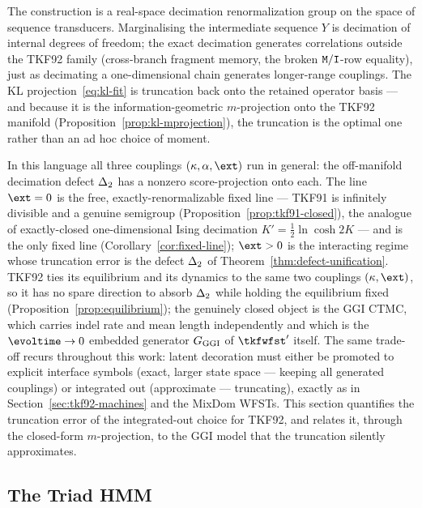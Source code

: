 The construction is a real-space decimation renormalization group on the
space of sequence transducers.  Marginalising the intermediate sequence
$Y$ is decimation of internal degrees of freedom; the exact decimation
generates correlations outside the TKF92 family (cross-branch fragment
memory, the broken $\mathtt{M}/\mathtt{I}$-row equality), just as decimating a
one-dimensional chain generates longer-range couplings.  The KL
projection~\eqref{eq:kl-fit} is truncation back onto the retained operator
basis --- and because it is the information-geometric $m$-projection onto
the TKF92 manifold (Proposition~\ref{prop:kl-mprojection}), the truncation
is the optimal one rather than an ad hoc choice of moment.

In this language all three couplings $(\kappa,\alpha,\ext)$ run in general:
the off-manifold decimation defect $\Delta_2$ has a nonzero
score-projection onto each.  The line $\ext=0$ is the free,
exactly-renormalizable fixed line --- TKF91 is infinitely divisible and a
genuine semigroup (Proposition~\ref{prop:tkf91-closed}), the analogue of
exactly-closed one-dimensional Ising decimation
$K' = \tfrac12\ln\cosh 2K$ --- and is the only fixed line
(Corollary~\ref{cor:fixed-line}); $\ext>0$ is the interacting regime whose
truncation error is the defect $\Delta_2$ of
Theorem~\ref{thm:defect-unification}.  TKF92 ties its equilibrium and its
dynamics to the same two couplings $(\kappa,\ext)$, so it has no spare
direction to absorb $\Delta_2$ while holding the equilibrium fixed
(Proposition~\ref{prop:equilibrium}); the genuinely closed object is the
GGI CTMC, which carries indel rate and mean length independently and which
is the $\evoltime\to0$ embedded generator $G_{\mathrm{GGI}}$ of $\tkfwfst'$ itself.
The same trade-off recurs throughout this work: latent decoration must
either be promoted to explicit interface symbols (exact, larger state space
--- keeping all generated couplings) or integrated out (approximate ---
truncating), exactly as in Section~\ref{sec:tkf92-machines} and the MixDom
WFSTs.  This section quantifies the truncation error of the
integrated-out choice for TKF92, and relates it, through the closed-form
$m$-projection, to the GGI model that the truncation silently approximates.

\subsection{The Triad HMM}
\label{sec:comp-triad-hmm}

